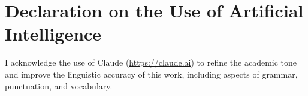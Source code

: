 {{{    }{%
        \chapter*{Declaration on the Use of Artificial Intelligence}

        \vspace{2em}

        I acknowledge the use of Claude (\url{https://claude.ai}) to refine the academic tone and improve the linguistic accuracy of this work, including aspects of grammar, punctuation, and vocabulary.

}}}
